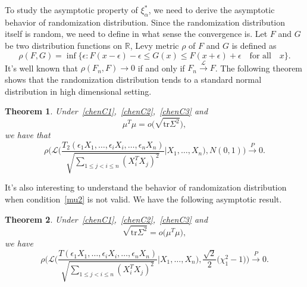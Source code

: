 \documentclass[review]{elsarticle}
\theoremstyle{plain}
\newtheorem{theorem}{\quad\quad Theorem}
\theoremstyle{definition}
\theoremstyle{remark}
\begin{document}
To study the asymptotic property of $\xi^*_{\alpha}$, we need to derive the asymptotic behavior of randomization distribution.
Since the randomization distribution itself is random, we need to define in what sense the convergence is. Let $F$ and $G$ be two distribution functions on $\mathbb{R}$, Levy metric $\rho$ of $F$ and $G$ is defined as
\begin{equation*}
    \rho(F,G)=\inf\{\epsilon:F(x-\epsilon)-\epsilon\leq G(x)\leq F(x+\epsilon)+\epsilon\quad  \textrm{for all}\quad x\}.
\end{equation*}
It's well known that $\rho(F_n,F)\to 0$ if and only if  $F_n\xrightarrow{\mathcal{L}}F$.
The following theorem shows that the randomization distribution tends to a standard normal distribution in high dimensional setting.


\begin{theorem}\label{shaziCLT}
    Under~\eqref{chenC1},~\eqref{chenC2},~\eqref{chenC3} and 
    \begin{equation}\label{mu2}
        \mu^T\mu=o\big(\sqrt{\mathrm{tr}{\Sigma}^2}\big),
    \end{equation}
    we have that
    \begin{equation*}
        \rho\Big(\mathcal{L}\Big(\frac{T_2(\epsilon_1 X_1,\ldots, \epsilon_i X_i,\ldots,\epsilon_n X_n)}{\sqrt{\sum_{1\leq j<i\leq n}{(X_i^T X_j)}^2}}\Big|X_1,\ldots,X_n\Big),N(0,1)\Big)\xrightarrow{P} 0.
    \end{equation*}
\end{theorem}
It's also interesting to understand the behavior of randomization distribution when condition~\eqref{mu2} is not valid. We have the following asymptotic result.
\begin{theorem}\label{farT}
    Under~\eqref{chenC1},~\eqref{chenC2},~\eqref{chenC3} and
    \begin{equation}\label{mu3}
       \sqrt{\mathrm{tr}{\Sigma}^2} =o\big(\mu^T\mu\big),
    \end{equation}
    we have
    \begin{equation*}
        \rho\Big(\mathcal{L}\Big(\frac{T(\epsilon_1 X_1,\ldots, \epsilon_i X_i,\ldots,\epsilon_n X_n)}{\sqrt{\sum_{1\leq j<i\leq n}{(X_i^T X_j)}^2}}\Big|X_1,\ldots,X_n\Big),\frac{\sqrt{2}}{2}\big(\chi^2_1-1\big)\Big)\xrightarrow{P} 0.
    \end{equation*}
\end{theorem}
\end{document}
